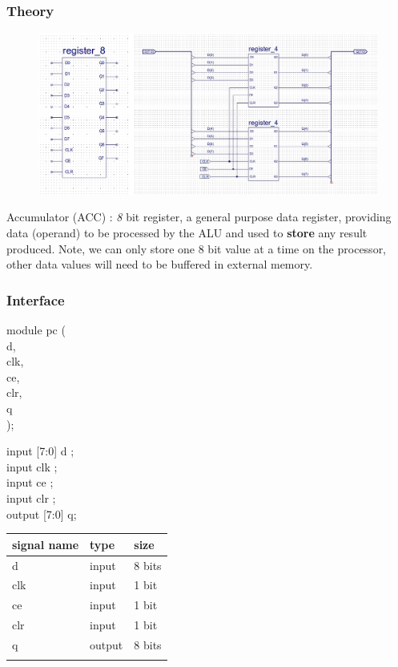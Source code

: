 \documentclass[11pt]{article}
\begin{document}
\subsubsection{Theory}
\label{sec:orgd1baab1}
\begin{figure}[htbp]
\centering
\includegraphics[width=.9\linewidth]{./images/reg8.jpg}
\caption{\label{fig:orgb0c3f8d}
}
\end{figure}
Accumulator (ACC) : \emph{8} bit register, a general purpose data register, providing data (operand) to be processed by the ALU and used to \textbf{store} any result produced. Note, we can only store one 8 bit value at a time on the processor, other data values will need to be buffered in external memory.
\subsubsection{Interface}
\label{sec:org8fe1aca}
module pc (\\
d,\\
clk,\\
ce,\\
clr,\\
q\\
);

input [7:0] d     ; \\
input clk         ;   \\
input ce      ; \\
input clr     ; \\
output [7:0] q; \\

\begin{center}
\begin{tabular}{lll}
signal name & type & size\\
\hline
d & input & 8 bits\\
clk & input & 1 bit\\
ce & input & 1 bit\\
clr & input & 1 bit\\
q & output & 8 bits\\
 &  & \\
\hline
\end{tabular}
\end{center}
\end{document}
